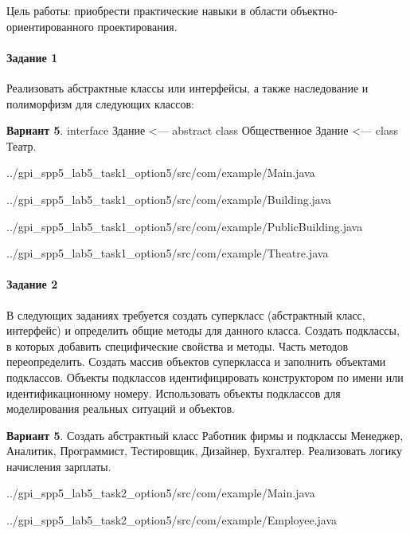 Цель работы:
приобрести практические навыки в области объектно-ориентированного проектирования.


\paragraph{Задание 1} \hspace{0cm}

Реализовать абстрактные классы или интерфейсы,
а также наследование и полиморфизм для следующих классов:

\textbf{Вариант 5}.
interface Здание <--- abstract class Общественное Здание <--- class Театр.


{../gpi_spp5_lab5_task1_option5/src/com/example/Main.java}


{../gpi_spp5_lab5_task1_option5/src/com/example/Building.java}


{../gpi_spp5_lab5_task1_option5/src/com/example/PublicBuilding.java}


{../gpi_spp5_lab5_task1_option5/src/com/example/Theatre.java}


\paragraph{Задание 2} \hspace{0cm}

В следующих заданиях требуется создать суперкласс (абстрактный класс, интерфейс)
и определить общие методы для данного класса.
Создать подклассы, в которых добавить специфические свойства и методы.
Часть методов переопределить.
Создать массив объектов суперкласса и заполнить объектами подклассов.
Объекты подклассов идентифицировать конструктором по имени или идентификационному номеру.
Использовать объекты подклассов для моделирования реальных ситуаций и объектов.

\textbf{Вариант 5}.
Создать абстрактный класс Работник фирмы и подклассы Менеджер,
Аналитик, Программист, Тестировщик, Дизайнер, Бухгалтер.
Реализовать логику начисления зарплаты.


{../gpi_spp5_lab5_task2_option5/src/com/example/Main.java}


{../gpi_spp5_lab5_task2_option5/src/com/example/Employee.java}

